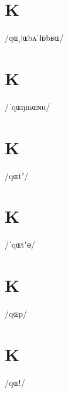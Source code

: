 \documentclass[10pt,a4paper,twoside]{book}
\begin{document}
\section*{K}

\begin{multicols}{3}
 {/qɶˌǀɶbʌˈǁɒbʁɶ/} {}
\end{multicols}

\section*{K}

\begin{multicols}{3}
 {/ˈqɶŋmɶɴu/} {}
\end{multicols}

\section*{K}

\begin{multicols}{3}
 {/qɶtʼ/} {}
\end{multicols}

\section*{K}

\begin{multicols}{3}
 {/ˈqɶtʼɵ/} {}
\end{multicols}

\section*{K}

\begin{multicols}{3}
 {/qɶp/} {}
\end{multicols}

\section*{K}

\begin{multicols}{3}
 {/qɶǃ/} {}
\end{multicols}
\end{document}
